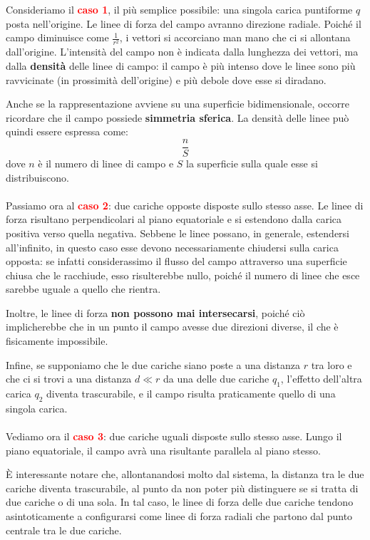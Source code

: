 \documentclass{book}
\begin{document}
\noindent
Consideriamo il \textbf{\textcolor{red}{caso 1}}, il più semplice possibile: una singola carica puntiforme $q$ posta nell’origine.  
Le linee di forza del campo avranno direzione radiale. Poiché il campo diminuisce come $\frac{1}{r^2}$, i vettori si accorciano man mano che ci si allontana dall’origine.  
L’intensità del campo non è indicata dalla lunghezza dei vettori, ma dalla \textbf{densità} delle linee di campo: il campo è più intenso dove le linee sono più ravvicinate (in prossimità dell’origine) e più debole dove esse si diradano.  

Anche se la rappresentazione avviene su una superficie bidimensionale, occorre ricordare che il campo possiede \textbf{simmetria sferica}.  
La densità delle linee può quindi essere espressa come:
\[
\frac{n}{S}
\]
dove $n$ è il numero di linee di campo e $S$ la superficie sulla quale esse si distribuiscono.  
\\
\\
Passiamo ora al \textbf{\textcolor{red}{caso 2}}: due cariche opposte disposte sullo stesso asse.  
Le linee di forza risultano perpendicolari al piano equatoriale e si estendono dalla carica positiva verso quella negativa.  
Sebbene le linee possano, in generale, estendersi all’infinito, in questo caso esse devono necessariamente chiudersi sulla carica opposta: se infatti considerassimo il flusso del campo attraverso una superficie chiusa che le racchiude, esso risulterebbe nullo, poiché il numero di linee che esce sarebbe uguale a quello che rientra.  

Inoltre, le linee di forza \textbf{non possono mai intersecarsi}, poiché ciò implicherebbe che in un punto il campo avesse due direzioni diverse, il che è fisicamente impossibile.  

Infine, se supponiamo che le due cariche siano poste a una distanza $r$ tra loro e che ci si trovi a una distanza $d \ll r$ da una delle due cariche $q_1$, l’effetto dell’altra carica $q_2$ diventa trascurabile, e il campo risulta praticamente quello di una singola carica.  
\\
\\
Vediamo ora il \textbf{\textcolor{red}{caso 3}}: due cariche uguali disposte sullo stesso asse.  
Lungo il piano equatoriale, il campo avrà una risultante parallela al piano stesso.  

È interessante notare che, allontanandosi molto dal sistema, la distanza tra le due cariche diventa trascurabile, al punto da non poter più distinguere se si tratta di due cariche o di una sola.  
In tal caso, le linee di forza delle due cariche tendono asintoticamente a configurarsi come linee di forza radiali che partono dal punto centrale tra le due cariche.  
\end{document}
